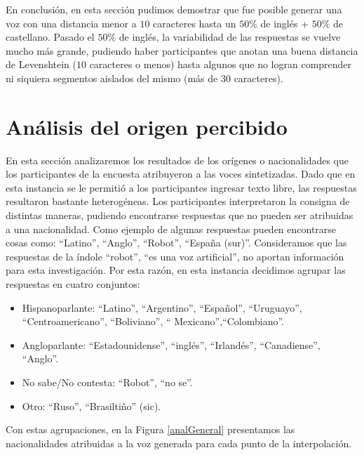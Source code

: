 En conclusión, en esta sección pudimos demostrar que fue posible generar una voz con una distancia menor a $10$ caracteres hasta un $50\%$ de inglés + $50\%$ de castellano. Pasado el $50\%$ de inglés, la variabilidad de las respuestas se vuelve mucho más grande, pudiendo haber participantes que anotan una buena distancia de Levenshtein ($10$ caracteres o menos) hasta algunos que no logran comprender ni siquiera segmentos aislados del mismo (más de $30$ caracteres).

\section{Análisis del origen percibido}

En esta sección analizaremos los resultados de los orígenes o nacionalidades que los participantes de la encuesta atribuyeron a las voces sintetizadas. Dado que en esta instancia se le permitió a los participantes ingresar texto libre, las respuestas resultaron bastante heterogéneas. Los participantes interpretaron la consigna de distintas maneras, pudiendo encontrarse respuestas que no pueden ser atribuidas a una nacionalidad. Como ejemplo de algunas respuestas pueden encontrarse cosas como: ``Latino'', ``Anglo'', ``Robot'', ``España (sur)''. Consideramos que las respuestas de la índole ``robot'', ``es una voz artificial'', no aportan información para esta investigación. Por esta razón, en esta instancia decidimos agrupar las respuestas en cuatro conjuntos:

\begin{itemize}
	\item Hispanoparlante: ``Latino'', ``Argentino'', ``Español'', ``Uruguayo'', ``Centroamericano'', ``Boliviano'', `` Mexicano'',``Colombiano''.
	\item Angloparlante: ``Estadounidense'', ``inglés'', ``Irlandés'', ``Canadiense'', ``Anglo''.
	\item No sabe/No contesta: ``Robot'', ``no se''.
	\item Otro: ``Ruso'', ``Brasiltiño'' (sic).
\end{itemize}

Con estas agrupaciones, en la Figura \ref{analGeneral} presentamos las nacionalidades atribuidas a la voz generada para cada punto de la interpolación.

